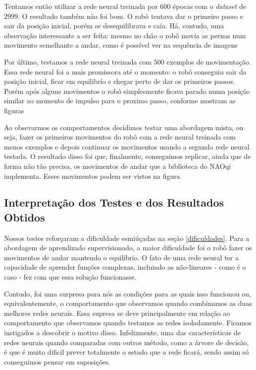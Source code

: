 \documentclass[twoside,conference,a4paper]{IEEEtran}
\begin{document}
Tentamos então utilizar a rede neural treinada por 600 épocas com o \textsl{dataset} de $2999$. O resultado também não foi bom. O robô tentava dar o primeiro passo e sair da posição inicial, porém se desequilibrava e caía. Há, contudo, uma observação interessante a ser feita: mesmo no chão o robô movia as pernas num movimento semelhante a andar, como é possível ver na sequência de imagens %



Por último, testamos a rede neural treinada com $500$ exemplos de movimentação. Essa rede neural foi a mais promissora até o momento: o robô conseguiu sair da posição inicial, ficar em equilibrío e chegar perto de dar os primeiros passos. Porém após alguns movimentos o robô simplesmente ficava parado numa posição similar ao momento de impulso para o proximo passo, conforme mostram as figuras %


Ao obsevarmos os comportamentos decidimos testar uma abordagem mista, ou seja, fazer os primeiros movimentos do robô com a rede neural treinada com menos exemplos e depois continuar os movimentos usando a segunda rede neural testada. O resultado disso foi que, finalmente, conseguimos replicar, ainda que de forma não tão precisa, os movimentos de andar que a biblioteca do NAOqi implementa. Esses movimentos podem ser vistos na figura %

\subsection{Interpretação dos Testes e dos Resultados Obtidos}

Nossos testes reforçaram a dificuldade esmiúçadas na seção \ref{dificuldades}. Para a abordagem de aprendizado supervisionado, a maior dificuldade foi o robô fazer os movimentos de andar mantendo o equilíbrio. O fato de uma rede neural ter a capacidade de aprender funções complexas, incluindo as não-lineares - como é o caso -  fez com que essa solução funcionasse.

Contudo, foi uma surpresa para nós as condições para as quais isso funcionou ou, equivalentemente, o comportamento que observamos quando combinamos as duas melhores redes neurais. Essa supresa se deve principalmente em relação ao comportamento que observamos quando testamos as redes isoladamente. Ficamos instigados a descobrir o motivo disso. Infelizmente, uma das características de redes neurais quando comparadas com outros método, como a árvore de decisão, é que é muito dificil prever totalmente o estado que a rede ficará, sendo assim só conseguimos pensar em suposições.
\end{document}
